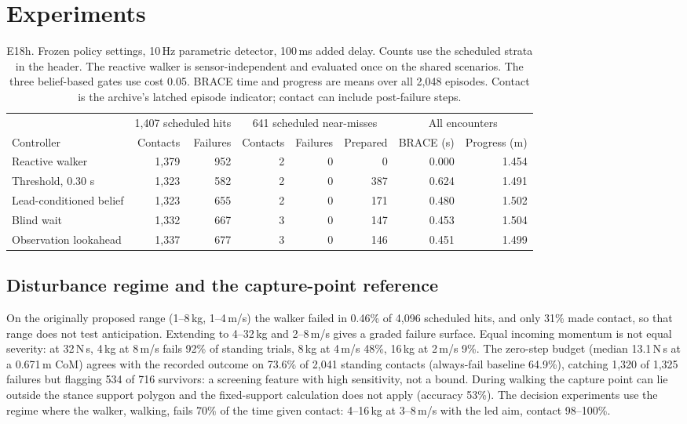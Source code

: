 \documentclass[10pt,twocolumn]{article}
\begin{document}
\section{Experiments}
\begin{table}[t]\centering\small\setlength{\tabcolsep}{5pt}
\caption{E18h. Frozen policy settings, 10\,Hz parametric detector, 100\,ms added delay. Counts use the scheduled strata in the header. The reactive walker is sensor-independent and evaluated once on the shared scenarios. The three belief-based gates use cost 0.05. BRACE time and progress are means over all 2,048 episodes. Contact is the archive's latched episode indicator; contact can include post-failure steps.}\label{tab:heldout}
\begin{tabular}{lrrrrrrr}\toprule
& \multicolumn{2}{c}{1,407 scheduled hits} & \multicolumn{3}{c}{641 scheduled near-misses} & \multicolumn{2}{c}{All encounters}\\
\cmidrule(lr){2-3}\cmidrule(lr){4-6}\cmidrule(lr){7-8}
Controller & Contacts & Failures & Contacts & Failures & Prepared & BRACE (s) & Progress (m) \\ \midrule
Reactive walker & 1,379 & 952 & 2 & 0 & 0 & 0.000 & 1.454 \\
Threshold, 0.30 s & 1,323 & 582 & 2 & 0 & 387 & 0.624 & 1.491 \\
Lead-conditioned belief & 1,323 & 655 & 2 & 0 & 171 & 0.480 & 1.502 \\
Blind wait & 1,332 & 667 & 3 & 0 & 147 & 0.453 & 1.504 \\
Observation lookahead & 1,337 & 677 & 3 & 0 & 146 & 0.451 & 1.499 \\ \bottomrule
\end{tabular}
\end{table}


\subsection{Disturbance regime and the capture-point reference}
On the originally proposed range (1--8\,kg, 1--4\,m/s) the walker failed in 0.46\% of 4,096 scheduled hits, and only 31\% made contact, so that range does not test anticipation. Extending to 4--32\,kg and 2--8\,m/s gives a graded failure surface. Equal incoming momentum is not equal severity: at 32\,N\,s, 4\,kg at 8\,m/s fails 92\% of standing trials, 8\,kg at 4\,m/s 48\%, 16\,kg at 2\,m/s 9\%. The zero-step budget (median 13.1\,N\,s at a 0.671\,m CoM) agrees with the recorded outcome on 73.6\% of 2,041 standing contacts (always-fail baseline 64.9\%), catching 1,320 of 1,325 failures but flagging 534 of 716 survivors: a screening feature with high sensitivity, not a bound. During walking the capture point can lie outside the stance support polygon and the fixed-support calculation does not apply (accuracy 53\%). The decision experiments use the regime where the walker, walking, fails 70\% of the time given contact: 4--16\,kg at 3--8\,m/s with the led aim, contact 98--100\%.
\end{document}
